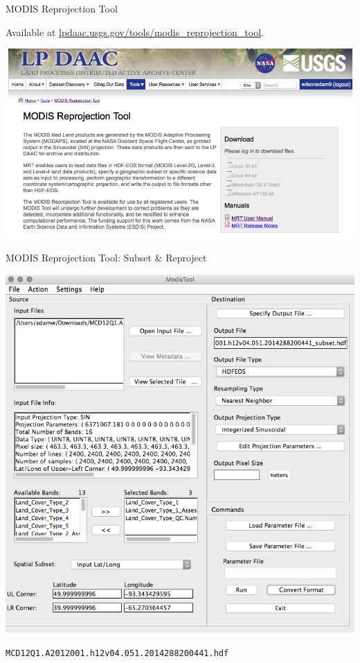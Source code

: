 \documentclass[ignorenonframetext,]{beamer}
\begin{document}
\begin{frame}{MODIS Reprojection Tool}

Available at
\href{https://lpdaac.usgs.gov/tools/modis_reprojection_tool}{lpdaac.usgs.gov/tools/modis\_reprojection\_tool}.

\includegraphics{assets/MRT1.png}

\end{frame}

\begin{frame}{MODIS Reprojection Tool: Subset \& Reproject}

\includegraphics{assets/MRT.png}

\texttt{MCD12Q1.A2012001.h12v04.051.2014288200441.hdf}

\end{frame}
\end{document}

